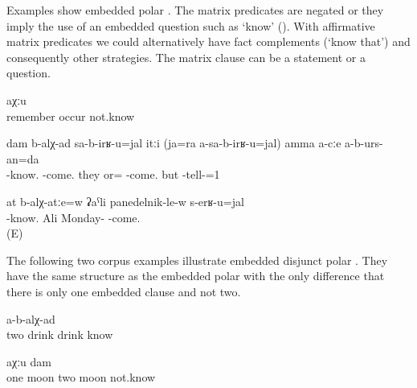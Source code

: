Examples  show embedded polar . The matrix predicates are negated or they imply the use of an embedded question such as `know' (). With affirmative matrix predicates we could alternatively have fact complements (`know that') and consequently other  strategies. The matrix clause can be a statement or a question.
%
\begin{exe}
	\ex	\label{ex:I don't know if he is remembering}
	\gll	[han	d-irč-aq-ul=el]	aχːu\\
		remember	occur	not.know\\
	\glt	{}

	\ex	\label{ex:‎‎I know whether they will come (or not), but I am not going to tell you.}
	\gll	dam	b-alχ-ad		sa-b-irʁ-u=jal	itːi		(ja=ra	a-sa-b-irʁ-u=jal)		amma	a-cːe	a-b-urs-an=da\\
			-know.	-come.	they	or= -come.		but		-tell-=1\\
	\glt	{}
	
	\ex	\label{ex:Do you know whether Ali will come on Monday?}
	\gll	at	b-alχ-atːe=w		ʡaˁli	panedelnik-le-w	s-erʁ-u=jal	\\
			-know.		Ali Monday-	-come.\\
	\glt	{} (E)
\end{exe}

The following two corpus examples illustrate embedded disjunct polar . They have the same structure as the embedded polar  with the only difference that there is only one embedded clause and not two. 

\begin{exe}
	\ex	\label{ex:I don't know whether they drank the second or not}
	\gll	[k'ʷi	ibil	b-erčː-ib-le=l	a-b-erčː-ib-le=l]	a-b-alχ-ad\\
		two		drink	drink	know\\
	\glt	{}

	\ex	\label{ex:I don't know if it was one month or two months}
	\gll	[ca	bac=de=l,	k'ʷel	bac=de=l]	aχːu	dam\\
		one	moon	two	moon	not.know	\\
	\glt	{}
\end{exe}


